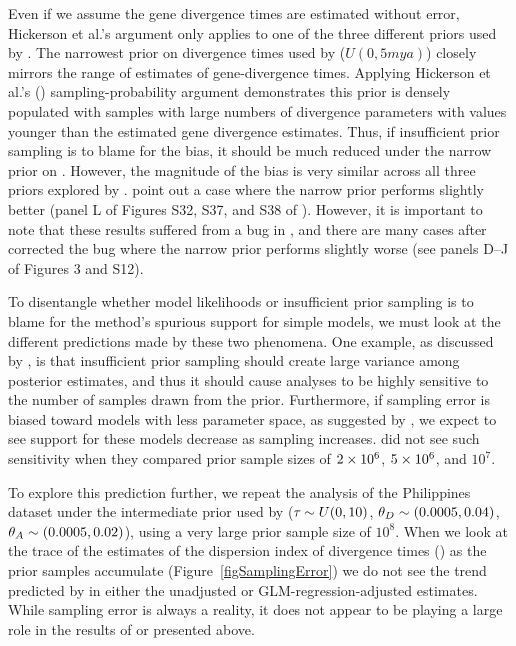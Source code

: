 Even if we assume the gene divergence times are estimated without error,
Hickerson et al.'s \citeyear{Hickerson2013} argument only applies to one of the
three different priors used by \citet{Oaks2012}.
The narrowest prior on divergence times used by \citet{Oaks2012} ($U(0, 5
mya)$) closely mirrors the range of estimates of gene-divergence times.
Applying Hickerson et al.'s (\citeyear{Hickerson2013}) sampling-probability
argument demonstrates this prior is densely populated with samples with large
numbers of divergence parameters with values younger than the estimated gene
divergence estimates.
Thus, if insufficient prior sampling is to blame for the bias, it should be
much reduced under the narrow prior on \divt{}.
However, the magnitude of the bias is very similar across all three priors
explored by \citet{Oaks2012}.
\citet{Hickerson2013} point out a case where the narrow prior performs
slightly better (panel L of Figures S32, S37, and S38 of \citet{Oaks2012}).
However, it is important to note that these results suffered from a bug
in \msb, and there are many cases after \citet{Oaks2012} corrected the 
bug where the narrow prior performs slightly worse (see panels D--J of
Figures 3 and S12).

To disentangle whether model likelihoods or insufficient prior sampling is to
blame for the method's spurious support for simple models, we must look at the
different predictions made by these two phenomena.
One example, as discussed by \citet{Oaks2012}, is that insufficient prior
sampling should create large variance among posterior estimates, and thus it
should cause analyses to be highly sensitive to the number of samples drawn
from the prior.
Furthermore, if sampling error is biased toward models with less
parameter space, as suggested by \citet{Hickerson2013}, we expect to see
support for these models decrease as sampling increases.
\citet{Oaks2012} did not see such sensitivity when they compared prior sample
sizes of $2\times 10^{6}$, $5\times 10^{6}$, and $10^7$.

To explore this prediction further, we repeat the analysis of the Philippines
dataset under the intermediate prior used by \citet{Oaks2012} ($\tau_{} \sim
U(0, 10)$, $\meanDescendantTheta{} \sim (0.0005, 0.04)$, $\ancestralTheta{}
\sim (0.0005, 0.02)$), using a very large prior sample size of $10^8$.
When we look at the trace of the estimates of the dispersion index of
divergence times (\vmratio{}) as the prior samples accumulate
(Figure~\ref{figSamplingError}) we do not see the trend predicted by
\citet{Hickerson2013} in either the unadjusted or GLM-regression-adjusted
estimates.
While sampling error is always a reality, it does not appear to be playing a
large role in the results of \citet{Oaks2012} or presented above.

